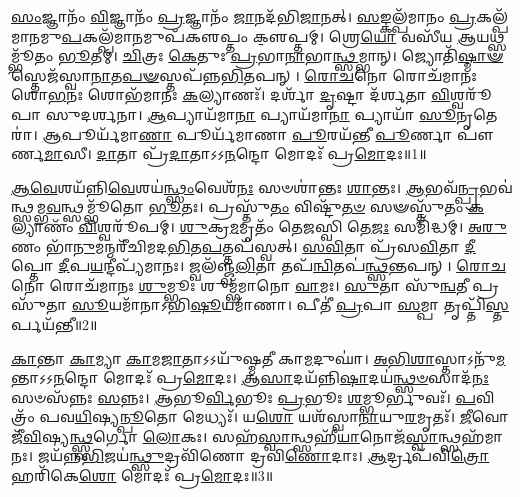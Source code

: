 \setcounter{anuvakam}{0}

   \ul{𑌸𑌂}\-𑌜𑍍𑌞𑌾𑌨𑌂᳴ \ul{𑌵𑌿}\-𑌜𑍍𑌞𑌾𑌨𑌂᳴ \ul{𑌪𑍍𑌰}\-𑌜𑍍𑌞𑌾𑌨𑌂᳴ \ul{𑌜𑌾}\-𑌨𑌦᳴𑌭𑌿\-\ul{𑌜𑌾}\-𑌨𑌤𑍍।
   \ul{𑌸}\-𑌙𑍍𑌕𑌲𑍍𑌪᳴𑌮𑌾𑌨𑌂 \ul{𑌪𑍍𑌰}\-𑌕𑌲𑍍𑌪᳴𑌮𑌾𑌨𑌮𑍁\-\ul{𑌪}\-\-𑌕𑌲𑍍𑌪᳴𑌮𑌾\-\ul{𑌨}\-𑌮𑍁𑌪᳴𑌕𑍢𑌪𑍍𑌤𑌂 𑌕𑍢॒𑌪𑍍𑌤𑌮𑍍।
   𑌶𑍍𑌰𑍇\-\ul{𑌯𑍋} 𑌵𑌸𑍀᳴𑌯 \ul{𑌆}\-𑌯\-𑌥𑍍𑌸𑌮𑍍𑌭𑍂᳴𑌤𑌂 \ul{𑌭𑍂}\-𑌤𑌮𑍍।
   \ul{𑌚𑌿}\-𑌤𑍍𑌰𑌃 \ul{𑌕𑍇}\-𑌤𑍁𑌃 \ul{𑌪𑍍𑌰}\-𑌭𑌾\-\ul{𑌨𑌾}\-𑌭𑌾\-\ul{𑌨𑍍𑌥𑍍𑌸}\-𑌮𑍍𑌭𑌾𑌨𑍍।
   𑌜𑍍𑌯𑍋𑌤𑌿᳴\-\-\ul{𑌷𑍍𑌮𑌾}\-\-\ul{𑍟}\-𑌸𑍍𑌤𑍇𑌜᳴𑌸𑍍𑌵𑌾\-\ul{𑌨𑌾}\-𑌤\-\ul{𑌪}\-\-\ul{𑍟}\-𑌸𑍍𑌤𑌪᳴𑌨𑍍𑌨\-\ul{𑌭𑌿}\-\-𑌤𑌪𑌨𑍍।
   \ul{𑌰𑍋}\-\-\ul{𑌚}\-𑌨𑍋 𑌰𑍋𑌚᳴𑌮𑌾𑌨𑌃 𑌶𑍋\-\ul{𑌭}\-𑌨𑌃 𑌶𑍋𑌭᳴𑌮𑌾𑌨𑌃 \ul{𑌕}\-𑌲𑍍𑌯𑌾𑌣𑌃᳴।
   𑌦𑌰𑍍\mbox{}𑌶𑌾᳴ \ul{𑌦𑍃}\-𑌷𑍍𑌟𑌾 𑌦᳴𑌰𑍍\mbox{}\-\ul{𑌶}\-𑌤𑌾 \ul{𑌵𑌿}\-𑌶𑍍𑌵𑌰𑍂᳴𑌪𑌾 𑌸𑍁𑌦𑌰𑍍\mbox{}\-\ul{𑌶}\-𑌨𑌾।
   \ul{𑌆}\-𑌪𑍍𑌯𑌾𑌯᳴𑌮𑌾\-\ul{𑌨𑌾} 𑌪𑍍𑌯𑌾𑌯᳴𑌮𑌾\-\ul{𑌨𑌾} 𑌪𑍍𑌯𑌾𑌯𑌾᳴ \ul{𑌸𑍂}\-𑌨𑍃𑌤𑍇𑌰𑌾॑।
   \ul{𑌆}\-𑌪𑍂𑌰𑍍𑌯᳴𑌮𑌾\-\ul{𑌣𑌾} 𑌪𑍂𑌰𑍍𑌯᳴𑌮𑌾𑌣𑌾 \ul{𑌪𑍂}\-𑌰𑌯᳴𑌨𑍍𑌤𑍀 \ul{𑌪𑍂}\-𑌰𑍍𑌣𑌾 𑌪𑍗॑𑌰𑍍𑌣\-\ul{𑌮𑌾}\-𑌸𑍀।
   \ul{𑌦𑌾}\-𑌤𑌾 𑌪𑍍𑌰᳴\-\ul{𑌦𑌾}\-𑌤𑌾𑌽𑌽\-\ul{𑌨}\-𑌨𑍍𑌦𑍋 𑌮𑍋𑌦𑌃᳴ 𑌪𑍍𑌰\-\ul{𑌮𑍋}\-𑌦𑌃॥1॥

   \ul{𑌆}\-\-\ul{𑌵𑍇}\-𑌶𑌯᳴𑌨𑍍𑌨𑌿\-\ul{𑌵𑍇}\-𑌶𑌯॑\-\ul{𑌨𑍍𑌥𑍍𑌸𑌂}\-𑌵𑍇𑌶᳴\-\ul{𑌨𑌃} 𑌸𑍞𑌶𑌾॑𑌨𑍍𑌤𑌃 \ul{𑌶𑌾}\-𑌨𑍍𑌤𑌃।
   \ul{𑌆}\-𑌭𑌵᳴\-\ul{𑌨𑍍𑌪𑍍𑌰}\-\-𑌭𑌵॑𑌨𑍍𑌥𑍍\-\-\ul{𑌸}\-𑌮𑍍𑌭\-\ul{𑌵}\-𑌨𑍍𑌥𑍍𑌸𑌮𑍍𑌭𑍂᳴𑌤𑍋 \ul{𑌭𑍂}\-𑌤𑌃।
   𑌪𑍍𑌰𑌸𑍍𑌤𑍁᳴\-\ul{𑌤𑌂} 𑌵𑌿𑌷𑍍𑌟𑍁᳴\-\ul{𑌤}\-\-\ul{𑍞} 𑌸𑍟𑌸𑍍𑌤𑍁᳴𑌤𑌂 \ul{𑌕}\-𑌲𑍍𑌯𑌾𑌣𑌂᳴ \ul{𑌵𑌿}\-𑌶𑍍𑌵𑌰𑍂᳴𑌪𑌮𑍍।
   \ul{𑌶𑍁}\-𑌕𑍍𑌰\-\ul{𑌮}\-𑌮𑍃𑌤𑌂᳴ 𑌤𑍇\-\ul{𑌜}\-𑌸𑍍𑌵𑌿 𑌤𑍇\-\ul{𑌜𑌃} 𑌸𑌮𑌿᳴𑌦𑍍𑌧𑌮𑍍।
   \ul{𑌅}\-\-\ul{𑌰𑍁}\-𑌣𑌂 𑌭𑌾᳴\-\ul{𑌨𑍁}\-𑌮𑌨𑍍𑌮𑌰𑍀᳴𑌚𑌿𑌮𑌦\-\ul{𑌭𑌿}\-𑌤\-\ul{𑌪}\-𑌤𑍍𑌤𑌪᳴𑌸𑍍𑌵𑌤𑍍।
   \ul{𑌸}\-\-\ul{𑌵𑌿}\-𑌤𑌾 𑌪𑍍𑌰᳴𑌸\-\ul{𑌵𑌿}\-𑌤𑌾 \ul{𑌦𑍀}\-𑌪𑍍𑌤𑍋 \ul{𑌦𑍀}\-𑌪\-\ul{𑌯}\-𑌨𑍍𑌦𑍀𑌪𑍍𑌯᳴𑌮𑌾𑌨𑌃।
   𑌜𑍍𑌵𑌲᳴𑌞𑍍𑌜𑍍𑌵\-\ul{𑌲𑌿}\-𑌤𑌾 𑌤𑌪᳴\-\ul{𑌨𑍍𑌵𑌿}\-𑌤𑌪॑\-\ul{𑌨𑍍𑌥𑍍𑌸}\-𑌨𑍍𑌤𑌪𑌨𑍍।
   \ul{𑌰𑍋}\-\-\ul{𑌚}\-𑌨𑍋 𑌰𑍋𑌚᳴𑌮𑌾𑌨𑌃 \ul{𑌶𑍁}\-𑌮𑍍𑌭𑍂𑌃 𑌶𑍁𑌮𑍍𑌭᳴𑌮𑌾𑌨𑍋 \ul{𑌵𑌾}\-𑌮𑌃।
   \ul{𑌸𑍁}\-𑌤𑌾 𑌸𑍁᳴\-\ul{𑌨𑍍𑌵}\-𑌤𑍀 𑌪𑍍𑌰𑌸𑍁᳴𑌤𑌾 \ul{𑌸𑍂}\-𑌯𑌮𑌾᳴𑌨𑌾𑌽𑌭𑌿\-\ul{𑌷𑍂}\-𑌯𑌮𑌾᳴𑌣𑌾।
   𑌪𑍀𑌤𑍀॑ \ul{𑌪𑍍𑌰}\-𑌪𑌾 \ul{𑌸}\-𑌮𑍍𑌪𑌾 𑌤𑍃𑌪𑍍𑌤𑌿᳴\-\ul{𑌸𑍍𑌤}\-𑌰𑍍𑌪𑌯᳴𑌨𑍍𑌤𑍀॥2॥

   \ul{𑌕𑌾}\-𑌨𑍍𑌤𑌾 \ul{𑌕𑌾}\-𑌮𑍍𑌯𑌾 \ul{𑌕𑌾}\-𑌮\-\ul{𑌜𑌾}\-𑌤𑌾𑌽𑌽𑌯𑍁᳴𑌷𑍍𑌮𑌤𑍀 𑌕𑌾\-\ul{𑌮}\-𑌦𑍁𑌘𑌾॑।
   \ul{𑌅}\-\-\ul{𑌭𑌿}\-\-\ul{𑌶𑌾}\-𑌸𑍍𑌤𑌾𑌽\-𑌨𑍁᳴\-\ul{𑌮}\-𑌨𑍍𑌤𑌾𑌽𑌽\-\ul{𑌨}\-𑌨𑍍𑌦𑍋 𑌮𑍋𑌦𑌃᳴ 𑌪𑍍𑌰\-\ul{𑌮𑍋}\-𑌦𑌃।
   \ul{𑌆}\-\-\ul{𑌸𑌾}\-𑌦𑌯᳴𑌨𑍍𑌨𑌿\-\ul{𑌷𑌾}\-\-𑌦𑌯॑\-\ul{𑌨𑍍𑌥𑍍𑌸}\-\-\ul{𑍞}\-𑌸𑌾𑌦᳴\-\ul{𑌨𑌃} 𑌸𑍞𑌸᳴𑌨𑍍𑌨𑌃 \ul{𑌸}\-𑌨𑍍𑌨𑌃।
   \ul{𑌆}\-𑌭𑍂\-\ul{𑌰𑍍𑌵𑌿}\-𑌭𑍂𑌃 \ul{𑌪𑍍𑌰}\-𑌭𑍂𑌃 \ul{𑌶}\-𑌮𑍍𑌭𑍂𑌰𑍍𑌭𑍁𑌵𑌃᳴।
   \ul{𑌪}\-𑌵𑌿𑌤𑍍𑌰𑌂᳴ 𑌪𑌵\-\ul{𑌯𑌿}\-𑌷𑍍𑌯\-\ul{𑌨𑍍𑌪𑍂}\-𑌤𑍋 𑌮𑍇𑌧𑍍𑌯𑌃᳴।
   𑌯\-\ul{𑌶𑍋} 𑌯𑌶᳴𑌸𑍍𑌵𑌾\-\ul{𑌨𑌾}\-𑌯𑍁\-\ul{𑌰}\-𑌮𑍃𑌤𑌃᳴।
   \ul{𑌜𑍀}\-𑌵𑍋 𑌜𑍀᳴\-\ul{𑌵𑌿}\-𑌷𑍍𑌯\-\ul{𑌨𑍍𑌥𑍍𑌸𑍍𑌵}\-𑌰𑍍𑌗𑍋 \ul{𑌲𑍋}\-𑌕𑌃।
   𑌸𑌹᳴\-\ul{𑌸𑍍𑌵𑌾}\-𑌨𑍍𑌥𑍍𑌸𑌹𑍀᳴\-\ul{𑌯𑌾}\-𑌨𑍋𑌜᳴\-\ul{𑌸𑍍𑌵𑌾}\-𑌨𑍍𑌥𑍍𑌸𑌹᳴𑌮𑌾𑌨𑌃।
   𑌜𑌯᳴𑌨𑍍𑌨\-\ul{𑌭𑌿}\-𑌜𑌯॑\-\ul{𑌨𑍍𑌥𑍍𑌸𑍁}\-\-𑌦𑍍𑌰𑌵𑌿᳴𑌣𑍋 𑌦𑍍𑌰𑌵𑌿\-\ul{𑌣𑍋}\-𑌦𑌾𑌃।
   \ul{𑌆}\-𑌰𑍍𑌦𑍍𑌰𑌪᳴𑌵𑌿\-\ul{𑌤𑍍𑌰𑍋} 𑌹𑌰𑌿᳴𑌕𑍇\-\ul{𑌶𑍋} 𑌮𑍋𑌦𑌃᳴ 𑌪𑍍𑌰\-\ul{𑌮𑍋}\-𑌦𑌃॥3॥

